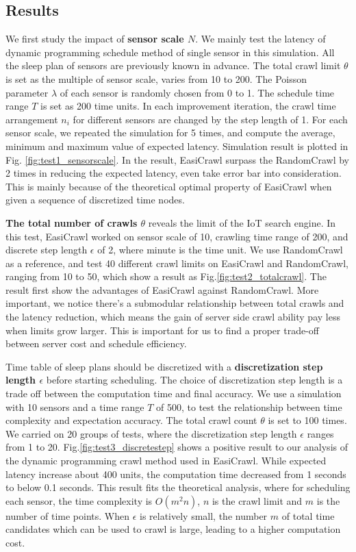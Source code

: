 \documentclass[conference]{IEEEtran}
\begin{document}
\subsection{Results}

We first study the impact of \textbf{sensor scale $N$}. 
We mainly test the latency of dynamic programming schedule method of single sensor in this simulation. 
All the sleep plan of sensors are previously known in advance.
The total crawl limit $\theta$ is set as the multiple of sensor scale, varies from 10 to 200. 
The Poisson parameter $\lambda$ of each sensor is randomly chosen from 0 to 1. 
The schedule time range $T$ is set as 200 time units. 
In each improvement iteration, the crawl time arrangement $n_i$ for different sensors are changed by the step length of 1. 
For each sensor scale, we repeated the simulation for 5 times, and compute the average, minimum and maximum value of expected latency. 
Simulation result is plotted in Fig. \ref{fig:test1_sensorscale}.
In the result, EasiCrawl surpass the RandomCrawl by 2 times in reducing the expected latency, even take error bar into consideration. 
This is mainly because of the theoretical optimal property of EasiCrawl when given a sequence of discretized time nodes. 

\textbf{The total number of crawls $\theta$} reveals the limit of the IoT search engine.
In this test, EasiCrawl worked on sensor scale of 10, crawling time range of 200, and discrete step length $\epsilon$ of 2, where minute is the time unit.
We use RandomCrawl as a reference, and test 40 different crawl limits on EasiCrawl and RandomCrawl, ranging from 10 to 50, which show a result as Fig.\ref{fig:test2_totalcrawl}.
The result first show the advantages of EasiCrawl against RandomCrawl. 
More important, we notice there's a submodular relationship between total crawls and the latency reduction, which means the gain of server side crawl ability pay less when limits grow larger. 
This is important for us to find a proper trade-off between server cost and schedule efficiency.

Time table of sleep plans should be discretized with a \textbf{discretization step length $\epsilon$} before starting scheduling. 
The choice of discretization step length is a trade off between the computation time and final accuracy. 
We use a simulation with 10 sensors and a time range $T$ of 500, to test the relationship between time complexity and expectation accuracy. 
The total crawl count $\theta$ is set to 100 times.
We carried on 20 groups of tests, where the discretization step length $\epsilon$ ranges from 1 to 20.
Fig.\ref{fig:test3_discretestep} shows a positive result to our analysis of the dynamic programming crawl method used in EasiCrawl. 
While expected latency increase about 400 units, the computation time decreased from 1 seconds to below 0.1 seconds. 
This result fits the theoretical analysis, where for scheduling each sensor, the time complexity is $O(m^{2}n)$, $n$ is the crawl limit and $m$ is the number of time points.
When $\epsilon$ is relatively small, the number $m$ of total time candidates which can be used to crawl is large, leading to a higher computation cost.
\end{document}
